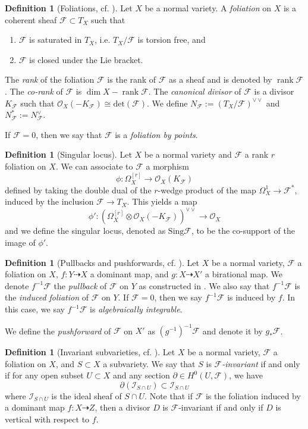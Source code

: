 \documentclass[11pt]{amsart}
\numberwithin{equation}{section}
\newcommand{\rk}{\operatorname{rank}}
\newcommand{\Ff}{\mathcal{F}}
\newcommand{\Sing}{\mathrm{Sing}}
\theoremstyle{definition}
\newtheorem{defn}[thm]{Definition}
\theoremstyle{definition}
\theoremstyle{definition}
\begin{document}
\begin{defn}[Foliations, {cf. \cite[Section 2.1]{CS21}}]\label{defn: foliation}
Let $X$ be a normal variety. A \emph{foliation} on $X$ is a coherent sheaf $\Ff\subset T_X$ such that
\begin{enumerate}
    \item $\Ff$ is saturated in $T_X$, i.e. $T_X/\Ff$ is torsion free, and
    \item $\Ff$ is closed under the Lie bracket.
\end{enumerate}
The \emph{rank} of the foliation $\Ff$ is the rank of $\Ff$ as a sheaf and is denoted by $\rk\Ff$. The \emph{co-rank} of $\Ff$ is $\dim X-\rk\Ff$. The \emph{canonical divisor} of $\Ff$ is a divisor $K_\Ff$ such that $\mathcal{O}_X(-K_{\mathcal{F}})\cong\mathrm{det}(\Ff)$. We define $N_{\Ff}:=(T_X/\Ff)^{\vee\vee}$ and $N_{\Ff}^*:=N_{\Ff}^{\vee}$.

If $\Ff=0$, then we say that $\Ff$ is a \emph{foliation by points}.
\end{defn}

\begin{defn}[Singular locus]
     Let $X$ be a normal variety and $\Ff$ a rank $r$ foliation on $X$. We can associate to $\Ff$ a morphism $$\phi: \Omega_X^{[r]}\to \mathcal{O}_X(K_{\Ff})$$ defined by taking the double dual of the $r$-wedge product of the map $\Omega^1_X\to \Ff^*$, induced by the inclusion $\Ff\to T_X$. This yields a map $$\phi': (\Omega_X^{[r]}\otimes\mathcal{O}_X(-K_{\Ff}))^{\vee\vee}\to \mathcal{O}_X$$ and we define the singular locus, denoted as $\Sing \Ff$, to be the co-support of the image of $\phi'$.
\end{defn}

\begin{defn}[Pullbacks and pushforwards, {cf. \cite[3.1]{ACSS21}}]\label{defn: pullback}
Let $X$ be a normal variety, $\Ff$ a foliation on $X$, $f: Y\dashrightarrow X$ a dominant map, and $g: X\dashrightarrow X'$ a birational map. We denote $f^{-1}\Ff$ the \emph{pullback} of $\Ff$ on $Y$ as constructed in \cite[3.2]{Dru21}. We also say that $f^{-1}\Ff$ is the \emph{induced foliation} of $\Ff$ on $Y$. If $\Ff=0$, then we say $f^{-1}\Ff$ is induced by $f$. In this case, we say $f^{-1}\Ff$ is \emph{algebraically integrable}.

We define the \emph{pushforward} of $\Ff$ on $X'$ as $(g^{-1})^{-1}\Ff$ and denote it by $g_*\Ff$.
\end{defn}




\begin{defn}[Invariant subvarieties, {cf. \cite[3.1]{ACSS21}}]\label{defn: f-invariant}
Let $X$ be a normal variety, $\Ff$ a foliation on $X$, and $S\subset X$ a subvariety. We say that $S$ is \emph{$\Ff$-invariant} if and only if for any open subset $U\subset X$ and any section $\partial\in H^0(U,\Ff)$, we have $$\partial(\mathcal{I}_{S\cap U})\subset \mathcal{I}_{S\cap U}$$ 
where $\mathcal{I}_{S\cap U}$ is the ideal sheaf of $S\cap U$. Note that if $\Ff$ is the foliation induced by a dominant map $f:X\dashrightarrow Z$, then a divisor $D$ is $\Ff$-invariant if and only if $D$ is vertical with respect to $f$.
\end{defn}
\end{document}
